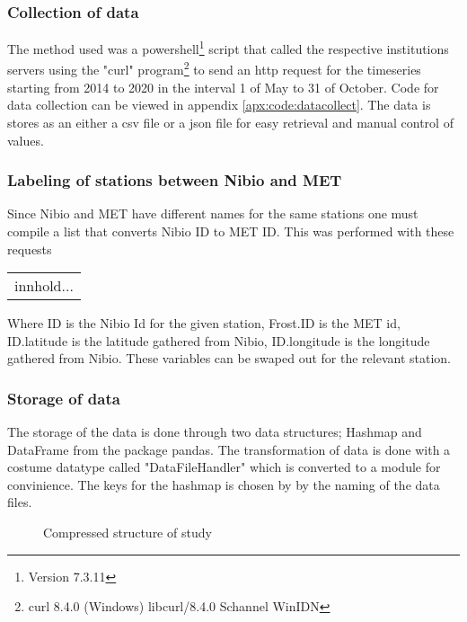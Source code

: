 \subsubsection{Collection of data}

The method used was a powershell\footnote{Version 7.3.11} script that called the respective institutions servers using the "curl" program\footnote{curl 8.4.0 (Windows) libcurl/8.4.0 Schannel WinIDN} to send an http request for the timeseries starting from 2014 to 2020 in the interval 1 of May to 31 of October. Code for data collection can be viewed in appendix \ref{apx:code:datacollect}. The data is stores as an either a csv file or a json file for easy retrieval and manual control of values.

\subsubsection{Labeling of stations between Nibio and MET}

Since Nibio and MET have different names for the same stations one must compile a list that converts Nibio ID to MET ID. This was performed with these requests 
\begin{table}
	\begin{tabular}{|l|}
		innhold...
	\end{tabular}
\end{table}
Where ID is the Nibio Id for the given station, Frost.ID is the MET id, ID.latitude is the latitude gathered from Nibio, ID.longitude is the longitude gathered from Nibio. These variables can be swaped out for the relevant station.

\subsubsection{Storage of data}
The storage of the data is done through two data structures; Hashmap and DataFrame from the package pandas. The transformation of data is done with a costume datatype called "DataFileHandler" which is converted to a module for convinience. The keys for the hashmap is chosen by by the naming of the data files. 

\begin{figure}[ht]
	\caption{Compressed structure of study}
\end{figure}

